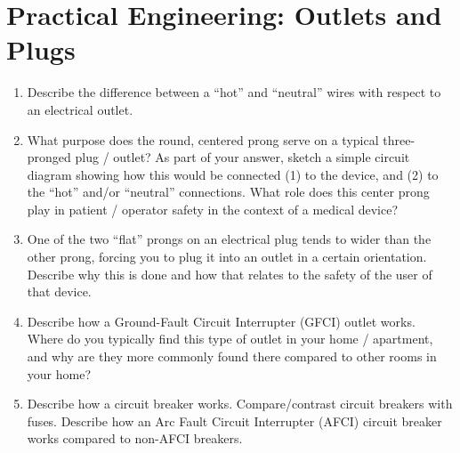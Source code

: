 \section{Practical Engineering: Outlets and Plugs}

\begin{enumerate}
\item Describe the difference between a ``hot'' and ``neutral'' wires with
respect to an electrical outlet.

\item What purpose does the round, centered prong serve on a typical
three-pronged plug / outlet?  As part of your answer, sketch a simple circuit
diagram showing how this would be connected (1) to the device, and (2) to the
``hot'' and/or ``neutral'' connections.  What role does this center prong play
in patient / operator safety in the context of a medical device?

\item One of the two ``flat'' prongs on an electrical plug tends to wider than
the other prong, forcing you to plug it into an outlet in a certain
orientation.  Describe why this is done and how that relates to the safety of
the user of that device.

\item Describe how a Ground-Fault Circuit Interrupter (GFCI) outlet works.
Where do you typically find this type of outlet in your home / apartment,
and why are they more commonly found there compared to other rooms in your
home?

\item Describe how a circuit breaker works.  Compare/contrast circuit breakers
with fuses.  Describe how an Arc Fault Circuit Interrupter (AFCI) circuit
breaker works compared to non-AFCI breakers. 
\end{enumerate}

